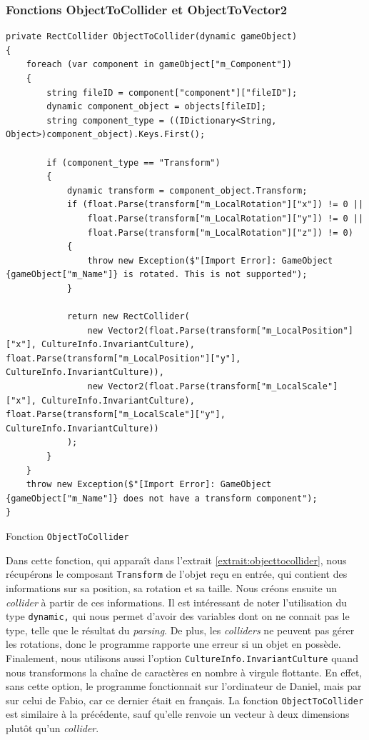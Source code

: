 \documentclass[a4paper]{article}
\begin{document}
\subsubsection{Fonctions ObjectToCollider et ObjectToVector2}
\begin{listing}[!h]
\begin{verbatim}
private RectCollider ObjectToCollider(dynamic gameObject)
{
    foreach (var component in gameObject["m_Component"])
    {
        string fileID = component["component"]["fileID"];
        dynamic component_object = objects[fileID];
        string component_type = ((IDictionary<String, Object>)component_object).Keys.First();

        if (component_type == "Transform")
        {
            dynamic transform = component_object.Transform;
            if (float.Parse(transform["m_LocalRotation"]["x"]) != 0 ||
                float.Parse(transform["m_LocalRotation"]["y"]) != 0 ||
                float.Parse(transform["m_LocalRotation"]["z"]) != 0)
            {
                throw new Exception($"[Import Error]: GameObject {gameObject["m_Name"]} is rotated. This is not supported");
            }

            return new RectCollider(
                new Vector2(float.Parse(transform["m_LocalPosition"]["x"], CultureInfo.InvariantCulture), float.Parse(transform["m_LocalPosition"]["y"], CultureInfo.InvariantCulture)),
                new Vector2(float.Parse(transform["m_LocalScale"]["x"], CultureInfo.InvariantCulture), float.Parse(transform["m_LocalScale"]["y"], CultureInfo.InvariantCulture))
            );
        }
    }
    throw new Exception($"[Import Error]: GameObject {gameObject["m_Name"]} does not have a transform component");
}
\end{verbatim}
\caption{Fonction \texttt{ObjectToCollider}}
\label{extrait:objecttocollider}
\end{listing}
\noindent Dans cette fonction, qui apparaît dans l'extrait \ref{extrait:objecttocollider}, nous récupérons le composant \texttt{Transform} de l'objet reçu en entrée, qui contient des informations sur sa position, sa rotation et sa taille. Nous créons ensuite un \textit{collider} à partir de ces informations. Il est intéressant de noter l'utilisation du type \texttt{dynamic,} qui nous permet d'avoir des variables dont on ne connait pas le type, telle que le résultat du \textit{parsing}. De plus, les \textit{colliders} ne peuvent pas gérer les rotations, donc le programme rapporte une erreur si un objet en possède. Finalement, nous utilisons aussi l'option \texttt{CultureInfo.InvariantCulture} quand nous transformons la chaîne de caractères en nombre à virgule flottante. En effet, sans cette option, le programme fonctionnait sur l'ordinateur de Daniel, mais par sur celui de Fabio, car ce dernier était en français. La fonction \texttt{ObjectToCollider} est similaire à la précédente, sauf qu'elle renvoie un vecteur à deux dimensions plutôt qu'un \textit{collider}.
\end{document}
